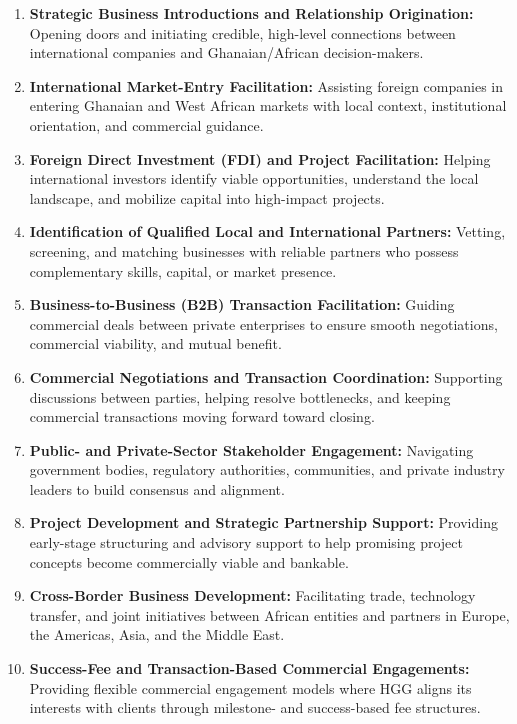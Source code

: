 \documentclass[11pt,a4paper]{article}
\begin{document}
\begin{enumerate}[leftmargin=*]
    \item \textbf{Strategic Business Introductions and Relationship Origination:} Opening doors and initiating credible, high-level connections between international companies and Ghanaian/African decision-makers.
    \item \textbf{International Market-Entry Facilitation:} Assisting foreign companies in entering Ghanaian and West African markets with local context, institutional orientation, and commercial guidance.
    \item \textbf{Foreign Direct Investment (FDI) and Project Facilitation:} Helping international investors identify viable opportunities, understand the local landscape, and mobilize capital into high-impact projects.
    \item \textbf{Identification of Qualified Local and International Partners:} Vetting, screening, and matching businesses with reliable partners who possess complementary skills, capital, or market presence.
    \item \textbf{Business-to-Business (B2B) Transaction Facilitation:} Guiding commercial deals between private enterprises to ensure smooth negotiations, commercial viability, and mutual benefit.
    \item \textbf{Commercial Negotiations and Transaction Coordination:} Supporting discussions between parties, helping resolve bottlenecks, and keeping commercial transactions moving forward toward closing.
    \item \textbf{Public- and Private-Sector Stakeholder Engagement:} Navigating government bodies, regulatory authorities, communities, and private industry leaders to build consensus and alignment.
    \item \textbf{Project Development and Strategic Partnership Support:} Providing early-stage structuring and advisory support to help promising project concepts become commercially viable and bankable.
    \item \textbf{Cross-Border Business Development:} Facilitating trade, technology transfer, and joint initiatives between African entities and partners in Europe, the Americas, Asia, and the Middle East.
    \item \textbf{Success-Fee and Transaction-Based Commercial Engagements:} Providing flexible commercial engagement models where HGG aligns its interests with clients through milestone- and success-based fee structures.
\end{enumerate}
\end{document}
